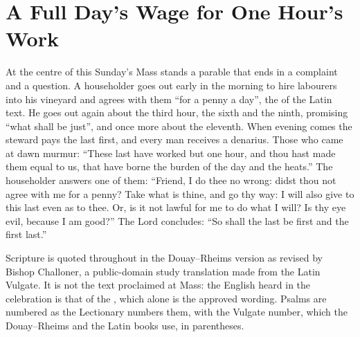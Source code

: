 \section{A Full Day's Wage for One Hour's Work}
\label{sec:opening}

At the centre of this Sunday's Mass stands a parable that ends in a complaint
and a question. A householder goes out early in the morning to hire labourers into
his vineyard and agrees with them ``for a penny a day'', the 
of the Latin text. He goes out again about the third hour, the sixth and the
ninth, promising ``what shall be just'', and once more about the eleventh. When
evening comes the steward pays the last first, and every man receives a
denarius. Those who came at dawn murmur: ``These last have worked but one
hour, and thou hast made them equal to us, that have borne the burden of the
day and the heats.'' The householder answers one of them: ``Friend, I do thee
no wrong: didst thou not agree with me for a penny? Take what is thine, and go
thy way: I will also give to this last even as to thee. Or, is it not lawful
for me to do what I will? Is thy eye evil, because I am good?'' The Lord
concludes: ``So shall the last be first and the first last.''

\medskip
{\small\noindent Scripture is quoted throughout in the Douay--Rheims version as
revised by Bishop Challoner, a public-domain study translation made from the
Latin Vulgate. It is not the text proclaimed at Mass: the English heard in the
celebration is that of the , which alone is the approved wording. Psalms are
numbered as the Lectionary numbers them, with the Vulgate number, which the
Douay--Rheims and the Latin books use, in parentheses.\par}
\medskip

